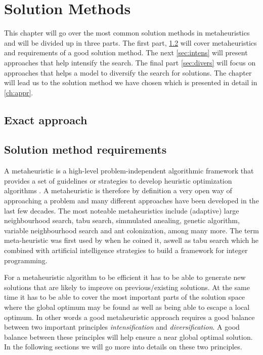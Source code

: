 \documentclass[../main.tex]{subfiles}
\begin{document}
                                                
\chapter{Solution Methods}
\label{ch:methods}

This chapter will go over the most common solution methods in metaheuristics and will be divided up in three parts.
The first part, \cref{sec:requirements} will cover metaheuristics and requirements of a good solution method.
The next \cref{sec:intens} will present approaches that help intensify the search. 
The final part \cref{sec:divers} will focus on approaches that helps a model to diversify the search for solutions. The chapter will lead us to the solution method we have chosen which is presented in detail in \cref{ch:appr}.

\section{Exact approach}
\label{sec:exact}

\section{Solution method requirements}
\label{sec:requirements}
A metaheuristic is a high-level problem-independent algorithmic framework that provides a set of guidelines or strategies to develop heuristic optimization algorithms \cite{sorensen13}. 
A metaheuristic is therefore by definition a very open way of approaching a problem and many different approaches have been developed in the last few decades.
The most noteable metaheuristics include (adaptive) large neighbourhood search, tabu search, simmulated anealing, genetic algorithm, variable neighbourhood search and ant colonization, among many more. 
The term meta-heuristic was first used by \cite{glover86} when he coined it, aswell as tabu search which he combined with artificial intelligence strategies to build a framework for integer programming. \par

For a metaheuristic algorithm to be efficient it has to be able to generate new solutions that are likely to improve on previous/existing solutions.
At the same time it has to be able to cover the most important parts of the solution space where the global optimum may be found as well as being able to escape a local optimum.
In other words a good metaheuristic approach requires a good balance between two important principles \textit{intensification} and \textit{diversification}. 
A good balance between these principles will help ensure a near global optimal solution.
In the following sections we will go more into details on these two principles.
\end{document}
